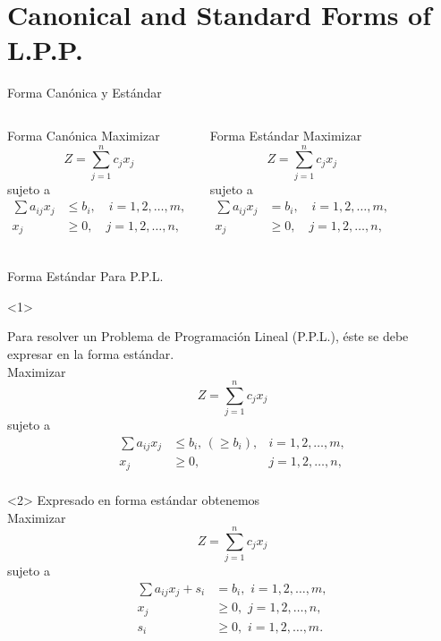 
\section{Canonical and Standard Forms of L.P.P.}
\label{sec:canonical-standard-form}

\begin{frame}{Forma Canónica y Estándar}
  \begin{columns}
      \begin{block}{Forma Canónica}
  Maximizar \[ Z = \sum_{j=1}^{n} c_j x_j\] 
  sujeto a
  \begin{align*}
    \sum a_{ij}x_j  & \leq b_i, \quad i = 1, 2, \ldots, m,\\
    x_j  & \geq 0, \quad j = 1, 2, \ldots, n,\\
  \end{align*}  
\end{block}
\begin{block}{Forma Estándar}
    Maximizar \[ Z = \sum_{j=1}^{n} c_j x_j\] 
  sujeto a
  \begin{align*}
    \sum a_{ij}x_j  & = b_i, \quad i = 1, 2, \ldots, m,\\
    x_j  & \geq 0, \quad j = 1, 2, \ldots, n,\\
  \end{align*}
\end{block}
  \end{columns}
\end{frame}


\begin{frame}{Forma Estándar Para P.P.L.}
  \begin{onlyenv}<1>
    
    Para resolver un Problema de Programación Lineal (P.P.L.), éste se debe expresar en la forma estándar.\\

    Maximizar \[ Z = \sum_{j=1}^{n} c_j x_j\] 
  sujeto a
  \begin{align*}
    \sum a_{ij}x_j  & \leq  b_i, \, (\geq b_i), & i = 1, 2, \ldots, m,\\
    x_j  & \geq 0, & j = 1, 2, \ldots, n,\\
  \end{align*}
\end{onlyenv}
\begin{onlyenv}<2>
  Expresado en forma estándar obtenemos\\

  Maximizar \[ Z = \sum_{j=1}^{n} c_j x_j\] 
  sujeto a
  \begin{align*}
    \sum a_{ij}x_j + s_i & =  b_i,  \,\, i = 1, 2, \ldots, m,\\
    x_j  & \geq 0, \, \, j = 1, 2, \ldots, n,\\
    s_i  & \geq 0, \, \, i = 1, 2, \ldots, m.\\
  \end{align*}
\end{onlyenv}
\end{frame}


